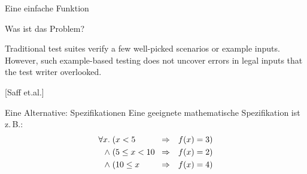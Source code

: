 \begin{frame}[t,fragile]{Eine einfache Funktion}
\begin{minipage}[t]{5.5cm}
\end{minipage}

\end{frame}

\begin{frame}{Was ist das Problem?}

\glqq{}Traditional test suites verify a few well-picked scenarios or example inputs. However, such example-based testing does not uncover errors in legal inputs that the test writer overlooked.\grqq{}

\hfill[Saff et.al.]

\end{frame}

\begin{frame}{Eine Alternative: Spezifikationen}
Eine geeignete mathematische Spezifikation ist z.\,B.:
\begin{eqnarray*}
\forall x. \; \parbox{2cm}{$(x < 5$} &\Rightarrow& f(x) = 3) \\
\land \; \parbox{2cm}{$(5 \leq x < 10$} &\Rightarrow& f(x) = 2)\\
\land \; \parbox{2cm}{$(10 \leq x$} &\Rightarrow& f(x) = 4)
\end{eqnarray*}
\end{frame}





